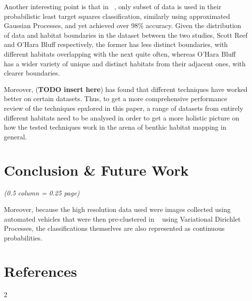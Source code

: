 \documentclass[10pt]{article}
\begin{document}
\begin{multicols}{2}
Another interesting point is that in ~\citet{bender12}, only subset of data is used in their probabilistic least target squares classification, similarly using approximated Gaussian Processes, and yet achieved over 98\% accuracy. Given the distribution of data and habitat boundaries in the dataset between the two studies, Scott Reef and O'Hara Bluff respectively, the former has less distinct boundaries, with different habitats overlapping with the next quite often, whereas O'Hara Bluff has a wider variety of unique and distinct habitats from their adjacent ones, with clearer boundaries.

Moreover, (\textbf{TODO insert here}) has found that different techniques have worked better on certain datasets. Thus, to get a more comprehensive performance review of the techniques epxlored in this paper, a range of datasets from entirely different habitats need to be analysed in order to get a more holistic picture on how the tested techniques work in the arena of benthic habitat mapping in general.

\vfill
\columnbreak

\section{Conclusion \& Future Work}
\textit{(0.5 column = 0.25 page)}

Moreover, because the high resolution data used were images collected using automated vehicles that were then pre-clustered in ~\citet{steinberg11} using Variational Dirichlet Processes, the classifications themselves are also represented as continuous probabilities.

\section{References}





\end{multicols}{2}
\end{document}
